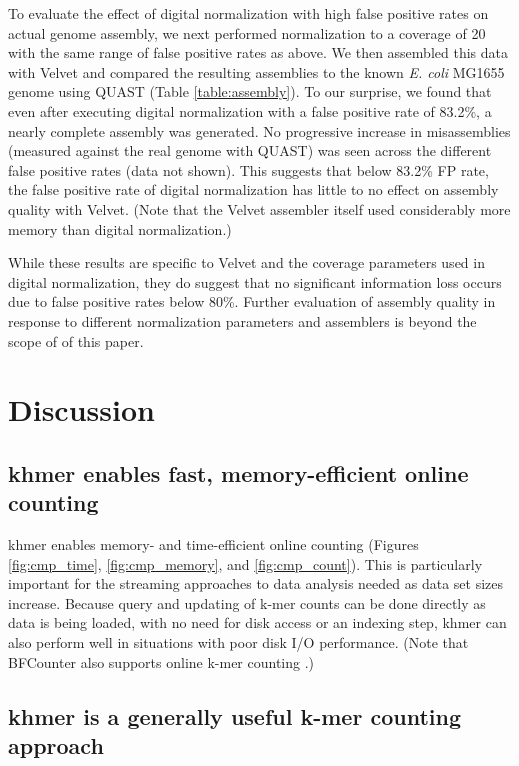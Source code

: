 \documentclass[10pt]{article}
\begin{document}
To evaluate the effect of digital normalization with high false
positive rates on actual genome assembly, we next performed
normalization to a coverage of 20 with the same range of false
positive rates as above.  We then assembled this data with Velvet
\cite{Zerbino2008} and compared the resulting assemblies to the known
     {\em E. coli} MG1655 genome using QUAST (Table
     \ref{table:assembly}).  To our surprise, we found that even after
     executing digital normalization with a false positive rate of
     83.2\%, a nearly complete assembly was generated.  No progressive
     increase in misassemblies (measured against the real genome with
     QUAST) was seen across the different false positive rates (data
     not shown). This suggests that below 83.2\% FP rate, the false
     positive rate of digital normalization has little to no effect on
     assembly quality with Velvet.  (Note that the Velvet assembler
     itself used considerably more memory than digital normalization.)


While these results are specific to Velvet and the coverage parameters
used in digital normalization, they do suggest that no significant
information loss occurs due to false positive rates below 80\%.
Further evaluation of assembly quality in response to different
normalization parameters and assemblers is beyond the scope of of this
paper.

\section*{Discussion}


\subsection*{khmer enables fast, memory-efficient online counting}

khmer enables memory- and time-efficient online counting (Figures
\ref{fig:cmp_time}, \ref{fig:cmp_memory}, and \ref{fig:cmp_count}).
This is particularly important for the streaming approaches to data
analysis needed as data set sizes increase.  Because query and
updating of k-mer counts can be done directly as data is being loaded,
with no need for disk access or an indexing step, khmer can also
perform well in situations with poor disk I/O performance.  (Note that
BFCounter also supports online k-mer counting \cite{Melsted2011}.)


\subsection*{khmer is a generally useful k-mer counting approach}
\end{document}
